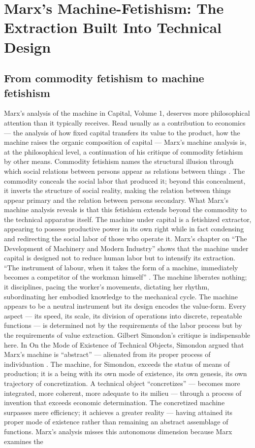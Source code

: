 \section{Marx’s Machine-Fetishism: The Extraction Built Into Technical Design}

\subsection{From commodity fetishism to machine fetishism}

Marx’s analysis of the machine in Capital, Volume 1, deserves more philosophical attention than it typically receives. Read usually as a contribution to economics — the analysis of how fixed capital transfers its value to the product, how the machine raises the organic composition of capital — Marx’s machine analysis is, at the philosophical level, a continuation of his critique of commodity fetishism by other means. Commodity fetishism names the structural illusion through which social relations between persons appear as relations between things \cite[pp.~163--177]{marx_1976}. The commodity conceals the social labor that produced it; beyond this concealment, it inverts the structure of social reality, making the relation between things appear primary and the relation between persons secondary. What Marx’s machine analysis reveals is that this fetishism extends beyond the commodity to the technical apparatus itself. The machine under capital is a fetishized extractor, appearing to possess productive power in its own right while in fact condensing and redirecting the social labor of those who operate it. Marx’s chapter on “The Development of Machinery and Modern Industry” shows that the machine under capital is designed not to reduce human labor but to intensify its extraction. “The instrument of labour, when it takes the form of a machine, immediately becomes a competitor of the workman himself” \cite[p.~557]{marx_1976}. The machine liberates nothing; it disciplines, pacing the worker’s movements, dictating her rhythm, subordinating her embodied knowledge to the mechanical cycle. The machine appears to be a neutral instrument but its design encodes the value-form. Every aspect — its speed, its scale, its division of operations into discrete, repeatable functions — is determined not by the requirements of the labor process but by the requirements of value extraction. Gilbert Simondon’s critique is indispensable here. In On the Mode of Existence of Technical Objects, Simondon argued that Marx’s machine is “abstract” — alienated from its proper process of individuation \cite[pp.~51--78]{simondon_2017}. The machine, for Simondon, exceeds the status of means of production; it is a being with its own mode of existence, its own genesis, its own trajectory of concretization. A technical object “concretizes” — becomes more integrated, more coherent, more adequate to its milieu — through a process of invention that exceeds economic determination. The concretized machine surpasses mere efficiency; it achieves a greater reality — having attained its proper mode of existence rather than remaining an abstract assemblage of functions. Marx’s analysis misses this autonomous dimension because Marx examines the 